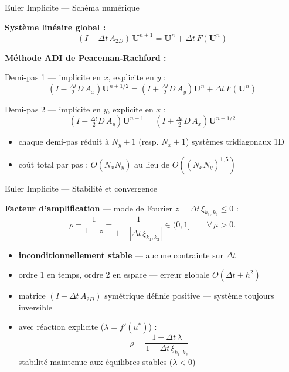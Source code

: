 \documentclass[10pt]{beamer}
\begin{document}
\begin{frame}{Euler Implicite — Schéma numérique}

\textbf{Système linéaire global :}
\begin{equation}
  \boxed{(I - \Delta t\,A_{2D})\,\mathbf{U}^{n+1} = \mathbf{U}^n + \Delta t\,F(\mathbf{U}^n)}
\end{equation}

\bigskip

\textbf{Méthode ADI de Peaceman-Rachford :}

\medskip

Demi-pas 1 — implicite en $x$, explicite en $y$ :
\begin{equation}
  \left(I - \tfrac{\Delta t}{2}D\,A_x\right)\mathbf{U}^{n+1/2}
  = \left(I + \tfrac{\Delta t}{2}D\,A_y\right)\mathbf{U}^n + \Delta t\,F(\mathbf{U}^n)
\end{equation}

Demi-pas 2 — implicite en $y$, explicite en $x$ :
\begin{equation}
  \left(I - \tfrac{\Delta t}{2}D\,A_y\right)\mathbf{U}^{n+1}
  = \left(I + \tfrac{\Delta t}{2}D\,A_x\right)\mathbf{U}^{n+1/2}
\end{equation}

\medskip

\begin{itemize}
  \item chaque demi-pas réduit à $N_y{+}1$ (resp. $N_x{+}1$) systèmes tridiagonaux 1D
  \item coût total par pas : $O(N_x N_y)$ au lieu de $O((N_x N_y)^{1{,}5})$
\end{itemize}

\end{frame}

\begin{frame}{Euler Implicite — Stabilité et convergence}

\textbf{Facteur d'amplification} — mode de Fourier $z = \Delta t\,\xi_{k_1,k_2} \leq 0$ :
\begin{equation}
  \rho = \frac{1}{1 - z} = \frac{1}{1 + |\Delta t\,\xi_{k_1,k_2}|} \in (0,1]
  \qquad \forall\, \mu > 0.
\end{equation}

\bigskip

\begin{itemize}
  \item \textbf{inconditionnellement stable} — aucune contrainte sur $\Delta t$
  \item ordre 1 en temps, ordre 2 en espace — erreur globale $O(\Delta t + h^2)$
  \item matrice $(I - \Delta t\,A_{2D})$ symétrique définie positive — système
        toujours inversible
  \item avec réaction explicite ($\lambda = f'(u^*)$) :
  \begin{equation}
    \rho = \frac{1 + \Delta t\,\lambda}{1 - \Delta t\,\xi_{k_1,k_2}}
  \end{equation}
  stabilité maintenue aux équilibres stables ($\lambda < 0$)
\end{itemize}

\end{frame}
\end{document}
